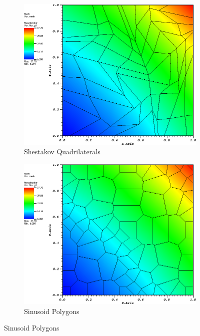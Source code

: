 \begin{figure}
{}
\vspace{3mm}
{
	\begin{subfigure}[b]{0.465\textwidth}
		\centering
		\label{subfig::shes_quad_me_k2_lin_sol}
		\includegraphics[width=\textwidth]{figures/sec_BF/quad_sol_shesquad.png}
		\caption{Shestakov Quadrilaterals}
	\end{subfigure}
	\hfill
	\begin{subfigure}[b]{0.465\textwidth}
		\centering
		\label{subfig::smooth_poly_me_k2_lin_sol}
		\includegraphics[width=\textwidth]{figures/sec_BF/quad_sol_sinepoly.png}
		\caption{Sinusoid Polygons}

\end{subfigure}}
\end{figure}
